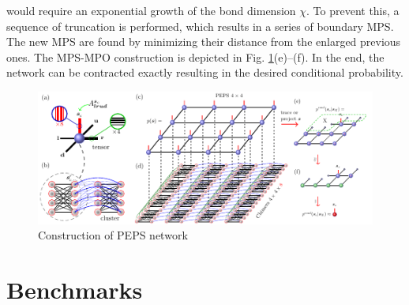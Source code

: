 would require an exponential growth of the bond dimension $\chi$. To prevent
this, a sequence of truncation is performed, which results in a series of
boundary MPS. The new MPS are found by minimizing their distance from the
enlarged previous ones. The MPS-MPO construction is depicted in Fig.
\ref{fig:tensors}(e)--(f). In the end, the network can be contracted exactly
resulting in the desired conditional probability.
\begin{figure}
  \includegraphics[width=\textwidth]{figures/peps.pdf}
  \caption{Construction of PEPS network} \label{fig:tensors}
\end{figure}

\section{Benchmarks}

